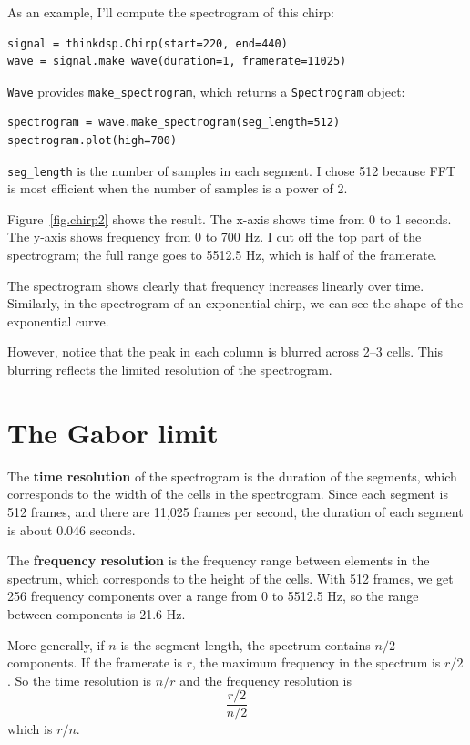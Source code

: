 \documentclass[12pt]{book}
\begin{document}
As an example, I'll compute the spectrogram of this chirp:

\begin{verbatim}
signal = thinkdsp.Chirp(start=220, end=440)
wave = signal.make_wave(duration=1, framerate=11025)
\end{verbatim}

{\tt Wave} provides \verb"make_spectrogram", which returns a
{\tt Spectrogram} object:

\begin{verbatim}
spectrogram = wave.make_spectrogram(seg_length=512)
spectrogram.plot(high=700)
\end{verbatim}

\verb"seg_length" is the number of samples in each segment.  I chose
512 because FFT is most efficient when the number of samples is a
power of 2.

Figure~\ref{fig.chirp2} shows the result.  The x-axis shows time from
0 to 1 seconds.  The y-axis shows frequency from 0 to 700 Hz.  I cut
off the top part of the spectrogram; the full range goes to 5512.5 Hz,
which is half of the framerate.

The spectrogram shows clearly that frequency increases linearly
over time.  Similarly, in the spectrogram of an exponential chirp, we
can see the shape of the exponential curve.

However, notice that the peak in each column is blurred across 2--3
cells.  This blurring reflects the limited resolution of the
spectrogram.


\section{The Gabor limit}
\label{gabor}

The {\bf time resolution} of the spectrogram is the duration of the
segments, which corresponds to the width of the cells in the
spectrogram.  Since each segment is 512 frames, and there are 11,025
frames per second, the duration of each segment is about 0.046 seconds.

The {\bf frequency resolution} is the frequency range between
elements in the spectrum, which corresponds to the height of the
cells.  With 512 frames, we get 256 frequency components over a range
from 0 to 5512.5 Hz, so the range between components is 21.6 Hz.

More generally, if $n$ is the segment length, the spectrum contains
$n/2$ components.  If the framerate is $r$, the maximum frequency in
the spectrum is $r/2$.  So the time resolution is $n/r$ and the
frequency resolution is
%
\[ \frac{r/2}{n/2} \]
%
which is $r/n$.
\end{document}
